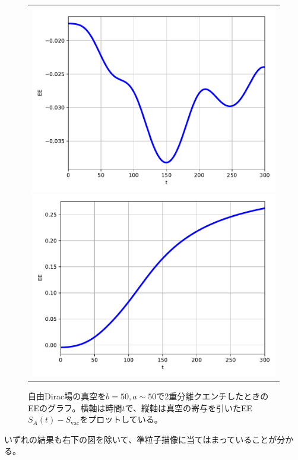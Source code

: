 \begin{figure}[H]
\begin{tabular}{c}
		\begin{minipage}{0.06\hsize}
			\vspace{10mm}
		\end{minipage} \\
		\begin{minipage}{0.50\hsize}
			\centering
			\includegraphics[width=\linewidth]{dd0945_30_100.pdf}
		\end{minipage}
		\begin{minipage}{0.50\hsize}
			\centering
			\includegraphics[width=\linewidth]{dd0945_150_100.pdf}
		\end{minipage}
	\end{tabular}
	\caption{自由Dirac場の真空を$b=50,a\sim 50$で2重分離クエンチしたときのEEのグラフ。横軸は時間$t$で、縦軸は真空の寄与を引いたEE $S_A(t)-S_\text{vac}$をプロットしている。}
	\label{fig:dd0945}
\end{figure}
いずれの結果も右下の図を除いて、準粒子描像に当てはまっていることが分かる。

